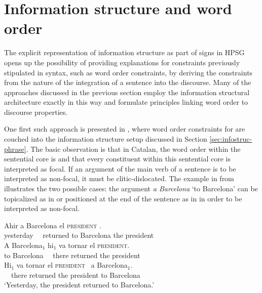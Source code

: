 \documentclass[output=paper
	        ,collection
	        ,collectionchapter
 	        ,biblatex
                ,babelshorthands
                ,newtxmath
                ,draftmode
                ,colorlinks, citecolor=brown
]{langscibook}
\begin{document}
\section{Information structure and word order}
\label{sec:word-order}
The explicit representation of information structure as part of signs
in HPSG opens up the possibility of providing explanations for
constraints previously stipulated in syntax, such as word order
constraints, by deriving the constraints from the nature of the
integration of a sentence into the discourse. Many of the approaches
discussed in the previous section employ the information structural
architecture exactly in this way and formulate principles linking word
order to discourse properties.

One first such approach is presented in \cite{EV96a}, where word order
constraints for  are couched into the information
structure setup discussed in Section \ref{sec:infostruc-phrase}. The
basic observation is that in Catalan, the word order within the
sentential core is  and that every constituent within this
sentential core is interpreted as focal. If an argument of the main
verb of a sentence is to be interpreted as non-focal, it must be
clitic-dislocated. The example in  from \cite{EV96a}
illustrates the two possible cases: the argument \textit{a Barcelona}
`to Barcelona' can be topicalized as in  or positioned at
the end of the sentence as in  in order to be interpreted
as non-focal.

\begin{exe}
  \ex\label{ex:catalan}
  \begin{xlist}
    \ex\gll Ahir  a Barcelona el \textsc{president} \RF.\\
         yesterday \ \ returned to Barcelona the president\\
   \ex\gll  A Barcelona$_1$ \LF hi$_1$ {va tornar} el \textsc{president}\RF.\\
           to Barcelona \ \  there returned the president\\\label{ex:catalan-a}
           \ex\gll \LF Hi$_1$ {va tornar} el \textsc{president}\RF\ {} a Barcelona$_1$.\\
            \ \  there  returned the president to Barcelona\\\label{ex:catalan-b}
\trans `Yesterday, the president returned to Barcelona.'
  \end{xlist}
\end{exe}
 
\end{document}
